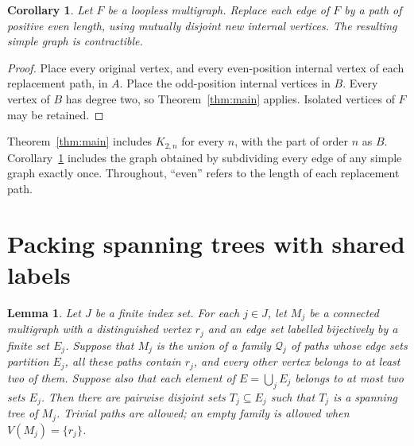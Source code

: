\documentclass[11pt]{amsart}
\newtheorem{lemma}[theorem]{Lemma}
\newtheorem{corollary}[theorem]{Corollary}
\begin{document}
\begin{corollary}\label{cor:even}
Let $F$ be a loopless multigraph. Replace each edge of $F$ by a path of
positive even length, using mutually disjoint new internal vertices.
The resulting simple graph is contractible.
\end{corollary}

\begin{proof}
Place every original vertex, and every even-position internal vertex of
each replacement path, in $A$. Place the odd-position internal vertices
in $B$. Every vertex of $B$ has degree two, so Theorem~\ref{thm:main}
applies. Isolated vertices of $F$ may be retained.
\end{proof}

Theorem~\ref{thm:main} includes $K_{2,n}$ for every $n$, with the part
of order $n$ as $B$. Corollary~\ref{cor:even} includes the graph obtained
by subdividing every edge of any simple graph exactly once. Throughout,
``even'' refers to the length of each replacement path.

\section{Packing spanning trees with shared labels}

\begin{lemma}\label{lem:packing}
Let $J$ be a finite index set. For each $j\in J$, let $M_j$ be a connected
multigraph with a distinguished vertex $r_j$ and an edge set labelled
bijectively by a finite set $E_j$. Suppose that $M_j$ is the union of a
family $\mathcal Q_j$ of paths whose edge sets partition $E_j$, all these
paths contain $r_j$, and every other vertex belongs to at least two of
them. Suppose also that each element of $E=\bigcup_j E_j$ belongs to at
most two sets $E_j$. Then there are pairwise disjoint sets
$T_j\subseteq E_j$ such that $T_j$ is a spanning tree of $M_j$.
Trivial paths are allowed; an empty family is allowed when $V(M_j)=\{r_j\}$.
\end{lemma}
\end{document}
